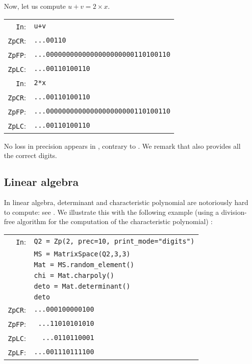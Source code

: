 \documentclass[sigconf]{acmart}
\newcommand{\ZpCR}{\text{\rm \tt ZpCR}\xspace}
\newcommand{\ZpFP}{\text{\rm \tt ZpFP}\xspace}
\newcommand{\ZpLC}{\text{\rm \tt ZpLC}\xspace}
\newcommand{\cIn}{{\color{blue} \tt \phantom{Zp}In}:}
\newcommand{\cZpCR}{{\color{red} \tt ZpCR}:}
\newcommand{\cZpFP}{{\color{red} \tt ZpFP}:}
\newcommand{\cZpLC}{{\color{red} \tt ZpLC}:}
\newcommand{\cZpLF}{{\color{red} \tt ZpLF}:}
\theoremstyle{definition}
\begin{document}
Now, let us compute $u+v=2 \times x.$

\begin{tabular}{rl}
\cIn
 & \verb?u+v? \\
\cZpCR
 & \verb?...00110? \\
\cZpFP
 & \verb?...0000000000000000000000110100110? \\
\cZpLC
 & \verb?...00110100110? \\
\cIn
 & \verb?2*x? \\
\cZpCR
 & \verb?...00110100110? \\
\cZpFP
 & \verb?...0000000000000000000000110100110? \\
\cZpLC
 & \verb?...00110100110? \\
\end{tabular}

No loss in precision appears in \ZpLC, contrary to \ZpCR.
We remark that \ZpFP also provides all the correct digits. 

\subsection{Linear algebra}

In linear algebra, determinant and 
characteristic polynomial are notoriously
hard to compute: see \cite{caruso-roe-vaccon:15, caruso-roe-vaccon:17}. We illustrate this with the following
example (using a division-free algorithm
for the computation of the characteristic polynomial) :



\begin{tabular}{rl}
\cIn
 & \verb?Q2 = Zp(2, prec=10, print_mode="digits")? \\
 & \verb?MS = MatrixSpace(Q2,3,3)? \\
 & \verb?Mat = MS.random_element()? \\
 & \verb?chi = Mat.charpoly()? \\
 & \verb?deto = Mat.determinant()? \\
 & \verb?deto? \\
\cZpCR
 & \verb?...000100000100? \\
\cZpFP
 & \verb? ...11010101010? \\
\cZpLC
 & \verb?  ...0110110001? \\
\cZpLF
 & \verb?...001110111100? \\
\end{tabular}
\end{document}
